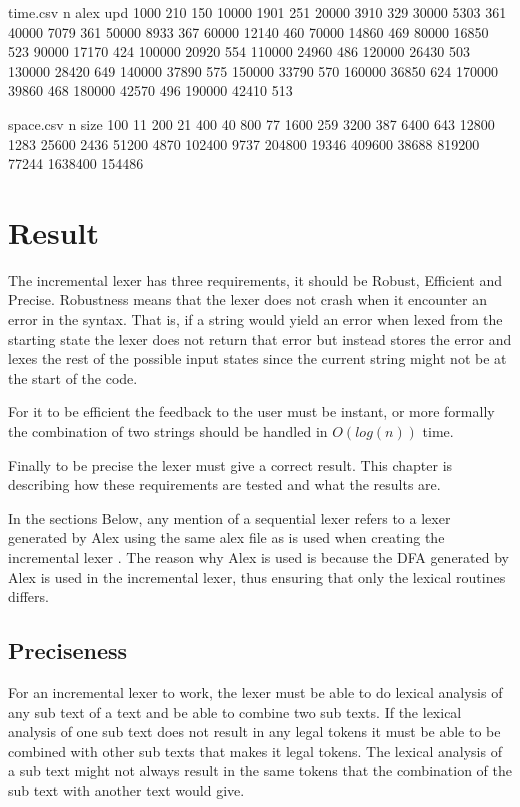 \begin{filecontents*}{time.csv}
n      alex   upd
1000   210    150
10000  1901   251
20000  3910   329
30000  5303   361
40000  7079   361
50000  8933   367
60000  12140  460
70000  14860  469
80000  16850  523
90000  17170  424
100000 20920  554
110000 24960  486
120000 26430  503
130000 28420  649
140000 37890  575
150000 33790  570
160000 36850  624
170000 39860  468
180000 42570  496
190000 42410  513
\end{filecontents*}

\begin{filecontents*}{space.csv}
n       size
100     11
200     21
400     40
800     77
1600    259
3200    387
6400    643
12800   1283
25600   2436
51200   4870
102400  9737
204800  19346
409600  38688
819200  77244
1638400 154486
\end{filecontents*}

\chapter{Result}
The incremental lexer has three requirements, it should be
Robust, Efficient and Precise. Robustness means that the lexer does not crash
when it encounter an error in the syntax. That is, if a string would yield an
error when lexed from the starting state the lexer does not return that error but
instead stores the error and lexes the rest of the possible input states since
the current string might not be at the start of the code.

For it to be efficient
the feedback to the user must be instant, or more formally the combination of two
strings should be handled in $O(log(n))$ time.

Finally to be precise the lexer
must give a correct result. This chapter is describing how these requirements
are tested and what the results are.

In the sections Below, any mention of a sequential lexer refers to a lexer
generated by Alex using the same alex file as is used when creating the
incremental lexer \cite{alex}. The reason why Alex is used is because the DFA
generated by Alex is used in the incremental lexer, thus ensuring that only the
lexical routines differs.

\section{Preciseness}
For an incremental lexer to work, the lexer must be able to do lexical analysis
of any sub text of a text and be able to combine two sub texts. If the lexical
analysis of one sub text does not result in any legal tokens it must be able to be
combined with other sub texts that makes it legal tokens. The lexical analysis of
a sub text might not always result in the same tokens that the combination of the
sub text with another text would give.

